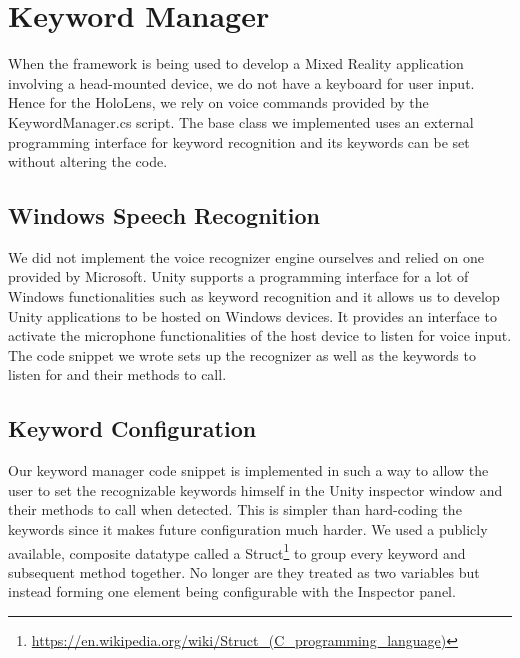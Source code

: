 \section{Keyword Manager}
When the framework is being used to develop a Mixed Reality application involving a head-mounted device, we do not have a keyboard for user input. Hence for the HoloLens, we rely on voice commands provided by the KeywordManager.cs script. The base class we implemented uses an external programming interface for keyword recognition and its keywords can be set without altering the code.

\subsection{Windows Speech Recognition}
We did not implement the voice recognizer engine ourselves and relied on one provided by Microsoft. Unity supports a programming interface for a lot of Windows functionalities such as keyword recognition and it allows us to develop Unity applications to be hosted on Windows devices. It provides an interface to activate the microphone functionalities of the host device to listen for voice input. The code snippet we wrote sets up the recognizer as well as the keywords to listen for and their methods to call. 



\subsection{Keyword Configuration}
Our keyword manager code snippet is implemented in such a way to allow the user to set the recognizable keywords himself in the Unity inspector window and their methods to call when detected. This is simpler than hard-coding the keywords since it makes future configuration much harder. We used a publicly available, composite datatype called a Struct\footnote{\protect\url{https://en.wikipedia.org/wiki/Struct\_(C\_programming\_language)}} to group every keyword and subsequent method together. No longer are they treated as two variables but instead forming one element being configurable with the Inspector panel. 


